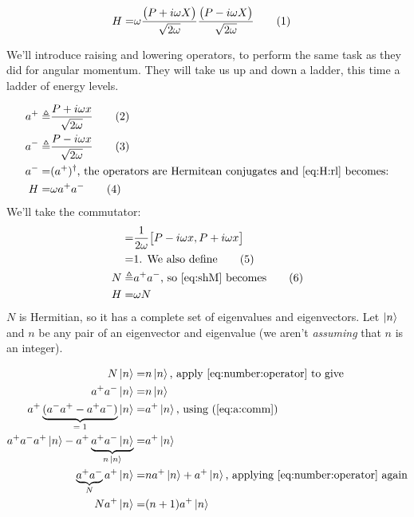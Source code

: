 \documentclass[]{article}
\newcommand\numberthis{\addtocounter{equation}{1}\tag{\theequation}}
\begin{document}
\begin{align*}
	H =& \omega \frac{\big(P + i \omega X \big)}{\sqrt{2 \omega}}\frac{\big(P - i \omega X \big)}{\sqrt{2 \omega}} \numberthis \label{eq:H:rl}
\end{align*}

We'll introduce raising and lowering operators, to perform the same task as they did for angular momentum. They will take us up and down a ladder, this time a ladder of energy levels.

\begin{align*}
	a^+ \triangleq & \frac{P + i \omega x } {\sqrt{2 \omega}} \numberthis \label{eq:creation:operator}\\
	a^- \triangleq & \frac{P - i \omega x } {\sqrt{2 \omega}} \numberthis \label{eq:annihilation:operator}\\
	a^-=& (a^+)^\dagger \text{, the operators are Hermitean conjugates and \eqref{eq:H:rl} becomes:}\\
	H =& \omega a^+ a^-\numberthis \label{eq:shM}
\end{align*}
We'll take the commutator:
\begin{align*}
	[a^-,a^+] =& \frac{1}{2\omega}\big[P - i \omega x,P + i \omega x\big]\\
	=& 1\text{. We also define} \numberthis \label{eq:a:comm}\\
	N \triangleq& a^+a^-\text{, so \eqref{eq:shM} becomes} \numberthis \label{eq:number:operator}\\
	H =& \omega N
\end{align*}
$N$ is Hermitian, so it has a complete set of eigenvalues and eigenvectors. Let  $\ket{n}$  and $n$ be any pair of an eigenvector and eigenvalue (we aren't \emph{assuming} that $n$ is an integer).

\begin{align*}
	N\ket{n} =& n\ket{n} \text{, apply \eqref{eq:number:operator} to give} \\
	a^+a^-\ket{n} =& n\ket{n}\\
	a^+\underbrace{(a^-a^+ - a^+a^-)}_\text{$=1$}\ket{n} =& a^+\ket{n}\text{, using (\ref{eq:a:comm})}\\
	a^+a^-a^+ \ket{n} - a^+\underbrace{a^+a^- \ket{n}}_\text{$ n\ket{n}$} =& a^+\ket{n} \\ 
	\underbrace{a^+a^-}_\text{$N$}a^+ \ket{n} =& n a^+\ket{n} + a^+\ket{n} \text{, applying \eqref{eq:number:operator} again}\\
	N a^+ \ket{n} =& (n+1) a^+ \ket{n}
\end{align*}
\end{document}
